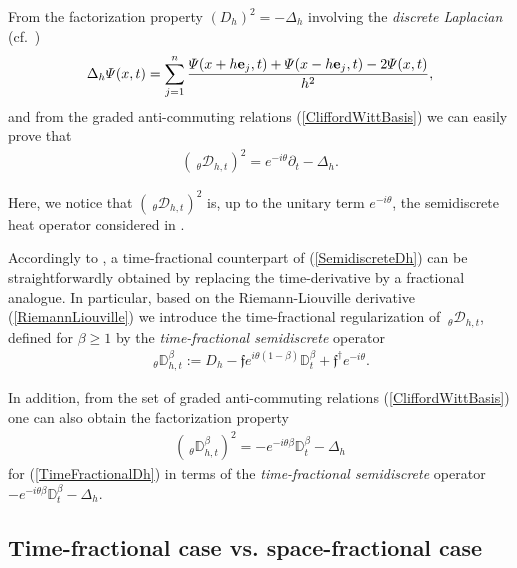 \documentclass{elsarticle}
\newcommand{\e}{{\bf e}}
\newcommand{\f}{{\mathfrak f}}
\begin{document}
From the factorization property $\left(D_h\right)^2=-\Delta_h$ involving the \textit{discrete Laplacian} (cf.~\cite[Proposition 2.1]{FaustinoKGordonDirac16})
\begin{eqnarray}
	\label{discreteLaplacian}
	\displaystyle \Delta_h \varPsi(x,t)=\sum_{j=1}^n
	\frac{\varPsi(x+h\e_j,t)+\varPsi(x-h\e_j,t)-2\varPsi(x,t)}{h^2},
\end{eqnarray}
and from the graded anti-commuting relations (\ref{CliffordWittBasis}) we can easily prove that 
\begin{eqnarray*}
	\left({~}_\theta\mathcal{D}_{h,t}\right)^2= e^{-i\theta}\partial_t-\Delta_h.
\end{eqnarray*}

Here, we notice that $\left({~}_\theta\mathcal{D}_{h,t}\right)^2$ is, up to the unitary term $e^{-i\theta}$, the semidiscrete heat operator considered in \cite{BBRS14}. 

Accordingly to \cite{FV16,FV17,BRS20}, a time-fractional counterpart of (\ref{SemidiscreteDh}) can be straightforwardly obtained by replacing the time-derivative by a fractional analogue. In particular, based on the Riemann-Liouville derivative (\ref{RiemannLiouville}) we introduce the time-fractional regularization of ${~}_\theta\mathcal{D}_{h,t}$, defined for $\beta\geq 1$ by the {\it time-fractional semidiscrete} operator
\begin{eqnarray}
	\label{TimeFractionalDh}
	{~}_\theta\mathbb{D}_{h,t}^\beta:=D_h-\f e^{i\theta(1-\beta)}\mathbb{D}_t^\beta +\f^\dagger e^{-i\theta}.
\end{eqnarray}

In addition, from the set of graded anti-commuting relations (\ref{CliffordWittBasis}) one can also obtain the factorization property 
\begin{eqnarray*}
	\left({~}_\theta\mathbb{D}_{h,t}^\beta\right)^2=-e^{-i\theta\beta}\mathbb{D}_t^\beta-\Delta_h
\end{eqnarray*}
for (\ref{TimeFractionalDh}) in terms of the {\it time-fractional semidiscrete} operator $-e^{-i\theta\beta}\mathbb{D}_t^\beta-\Delta_h$.




\subsection{Time-fractional case vs. space-fractional case}\label{SpaceFractionalSection}
\end{document}
